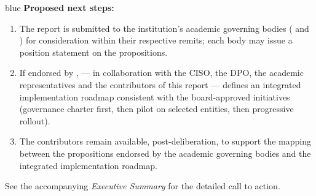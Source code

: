 \begin{stakeholderbox}{blue}
\medskip
\textbf{Proposed next steps:}
\begin{enumerate}[nosep]
    \item The report is submitted to the institution's academic
    governing bodies ( and
    ) for consideration within
    their respective remits; each body may issue a position
    statement on the propositions.
    \item If endorsed by , 
    --- in collaboration with the CISO, the DPO, the academic
    representatives and the contributors of this report ---
    defines an integrated implementation roadmap consistent with
    the board-approved initiatives (governance charter first, then
    pilot on selected entities, then progressive rollout).
    \item The contributors remain available, post-deliberation,
    to support the mapping between the propositions endorsed by
    the academic governing bodies and the integrated implementation
    roadmap.
\end{enumerate}
See the accompanying \emph{Executive Summary} for the detailed
call to action.
\end{stakeholderbox}

\bigskip

